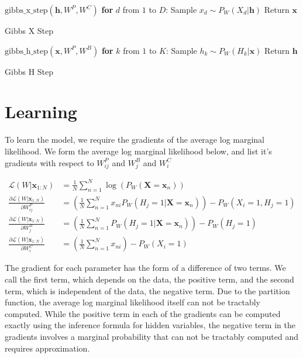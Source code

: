 \documentclass[11pt]{article}
\newcommand{\deriv}[2]{\frac{\partial{#1}}{\partial {#2}} }
\newcommand{\mbf}[1]{{\mathbf{#1}}}
\begin{document}
\begin{algorithm}[h!]
\begin{algorithmic}
\STATE $\mbox{gibbs\_x\_step}(\mbf{h},W^P,W^C)$
\STATE \textbf{for} $d$ from $1$ to $D$: Sample $x_d \sim P_W(X_d|\mbf{h})$
\STATE Return $\mbf{x}$
\end{algorithmic}
\caption{Gibbs X Step}
\end{algorithm}

\begin{algorithm}[h!]
\begin{algorithmic}
\STATE $\mbox{gibbs\_h\_step}(\mbf{x},W^P,W^B)$
\STATE \textbf{for} $k$ from $1$ to $K$: Sample $h_k \sim P_W(H_k|\mbf{x})$
\STATE Return $\mbf{h}$
\end{algorithmic}
\caption{Gibbs H Step}
\end{algorithm}


\medskip

\section{Learning} To learn the model, we require the gradients of the average log marginal likelihood. We form the average log marginal likelihood below, and list it's gradients with respect to $W_{ij}^P$ and $W^B_j$ and $W^C_i$

\begin{align}
\label{marginal_loglik}
\mathcal{L}(W|\mbf{x}_{1:N})&=\frac{1}{N}\sum_{n=1}^N\log(P_W(\mbf{X}=\mbf{x}_n))\\
%
\label{deriv_WP}
\deriv{\mathcal{L}(W|\mbf{x}_{1:N})}{W^P_{ij}}
&= \left(\frac{1}{N}\sum_{n=1}^Nx_{ni}P_W(H_j=1|\mbf{X}=\mbf{x}_n)\right)
-P_W(X_i=1,H_j=1)\\
%
\label{deriv_WB}
\deriv{\mathcal{L}(W|\mbf{x}_{1:N})}{W^B_{j}}
&= \left(\frac{1}{N}\sum_{n=1}^NP_W(H_j=1|\mbf{X}=\mbf{x}_n)\right)
-P_W(H_j=1)\\
%
\label{deriv_WC}
\deriv{\mathcal{L}(W|\mbf{x}_{1:N})}{W^C_{i}}
&= \left(\frac{1}{N}\sum_{n=1}^Nx_{ni}\right) -P_W(X_i=1)
\end{align}

The gradient for each parameter has the form of a difference of two terms. We call the first term, which depends on the data, the positive term, and the second term, which is independent of the data, the negative term. Due to the partition function, the average log marginal likelihood itself can not be tractably computed. While the positive term in each of the gradients can be computed exactly using the inference formula for hidden variables, the negative term in the gradients involves a marginal probability that can not be tractably computed and requires approximation.\\
\end{document}
